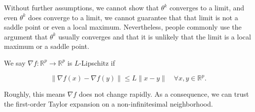 \documentclass{report}
\begin{document}
Without further assumptions, we cannot show that $\theta^{k}$ converges to a limit, and even $\theta^{k}$ does converge to a limit, we cannot guarantee that that limit is not a saddle point or even a local maximum. Nevertheless, people commonly use the argument that $\theta^{k}$ usually converges and that it is unlikely that the limit is a local maximum or a saddle point.

\begin{definition}[2.3][$L$-Lipschitz]
    We say $\nabla f: \mathbb{R}^{p} \rightarrow \mathbb{R}^{p}$ is $L$-Lipschitz if

    $$
    \|\nabla f(x)-\nabla f(y)\| \leq L\|x-y\| \quad \forall x, y \in \mathbb{R}^{p} .
    $$

    Roughly, this means $\nabla f$ does not change rapidly. As a consequence, we can trust the first-order Taylor expansion on a non-infinitesimal neighborhood.
\end{definition}
\end{document}
